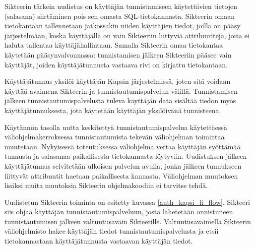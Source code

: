 Sikteerin tärkein uudistus on käyttäjän tunnistamiseen käytettävien tietojen (salasana) siirtäminen pois sen omasta SQL-tietokannasta. Sikteerin omaan tietokantaan tallennetaan jatkossakin niiden käyttäjien tiedot, joilla on pääsy järjestelmään, koska käyttäjällä on vain Sikteeriin liittyviä attribuutteja, joita ei haluta tallentaa käyttäjähallintaan. Samalla Sikteerin omaa tietokantaa käytetään pääsynvalvonnassa: tunnistamisen jälkeen Sikteeriin pääsee vain käyttäjät, joiden käyttäjätunnusta vastaava rivi on kirjattu tietokantaan.

Käyttäjätunnus yksilöi käyttäjän Kapsin järjestelmissä, joten sitä voidaan käyttää avaimena Sikteerin ja tunnistautumispalvelun välillä. Tunnistamisen jälkeen tunnistautumispalvelusta tuleva käyttäjän data sisältää tiedon myös käyttäjätunnuksesta, jota käytetään käyttäjän yksilöivänä tunnisteena.

Käytännön tasolla uutta keskitettyä tunnistautumispalvelua käytettäessä väliohjelmakerroksessa tunnistautumista tekevän väliohjelman toimintaa muutetaan. Nykyisessä toteutuksessa väliohjelma vertaa käyttäjän syöttämää tunnusta ja salasanaa paikallisesta tietokannasta löytyviin. Uudistuksen jälkeen käyttäjätunnus selvitetään ulkoisen palvelun avulla, jonka jälkeen tunnukseen liittyvät attribuutit haetaan paikallisesta kannasta. Väliohjelman muutoksen lisäksi muita muutoksia Sikteerin ohjelmakoodiin ei tarvitse tehdä.

Uudistetun Sikteerin toiminta on esitetty kuvassa \ref{auth_kapsi_fi_flow}. Sikteeri siis ohjaa käyttäjän tunnistautumispalveluun, josta lähetetään onnistuneen tunnistautumisen jälkeen valtuutusavain Sikteerille. Valtuutusavaimella Sikteerin väliohjelmisto hakee käyttäjän tiedot tunnistautumispalvelusta ja etsii tietokannastaan käyttäjätunnusta vastaavan käyttäjän tiedot.